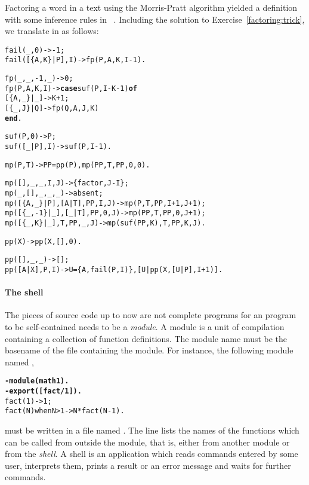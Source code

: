 Factoring a word in a text using the Morris\hyp{}Pratt algorithm
 yielded a definition with some
inference rules in \figs~. Including
the solution to Exercise~\vref{factoring:trick}, we translate in
\Erlang as follows:
\begin{alltt}
fail(        _,0) -> -1;
fail([\{A,K\}|P],I) -> fp(P,A,K,I-1).

fp(\_,\_,-1,\_) -> 0;
fp(P,A, K,I) -> \textbf{case} suf(P,I-K-1) \textbf{of}
                  [\{A,\_\}|\_] -> K + 1;
                  [\{\_,J\}|Q] -> fp(Q,A,J,K)
                \textbf{end}.

suf(    P,0) -> P;
suf([\_|P],I) -> suf(P,I-1).

mp(P,T) -> PP=pp(P), mp(PP,T,PP,0,0).

mp(        [],    \_, \_,I,J) -> \{factor,J-I\};
mp(         \_,   [], \_,\_,\_) -> absent;
mp( [\{A,\_\}|P],[A|T],PP,I,J) -> mp(P,T,PP,I+1,J+1);
mp([\{\_,-1\}|\_],[\_|T],PP,0,J) -> mp(PP,T,PP,0,J+1);
mp( [\{\_,K\}|\_],    T,PP,\_,J) -> mp(suf(PP,K),T,PP,K,J).

pp(X) -> pp(X,[],0).

pp(   [],\_,\_) -> [];
pp([A|X],P,I) -> U=\{A,fail(P,I)\}, [U|pp(X,[U|P],I+1)].
\end{alltt}

\paragraph{The \Erlang shell}

The pieces of source code up to now are not complete \Erlang programs
for an \Erlang program to be self\hyp{}contained needs to be a
\emph{module}. A module is a unit of compilation containing a
collection of function definitions. The module name must be the
basename of the file containing the module. For instance, the
following module named ,
\begin{alltt}
\textbf{-module(math1).}\hfill% \emph{Drop the file extension} .erl
\textbf{-export([fact/1]).}
fact(1)            -> 1;
fact(N) when N > 1 -> N * fact(N-1).
\end{alltt}
must be written in a file named . The
 line lists the names of the functions which can be
called from outside the module, that is, either from another module or
from the \Erlang \emph{shell}. A shell is an application which reads
commands entered by some user, interprets them, prints a result or an
error message and waits for further commands.

